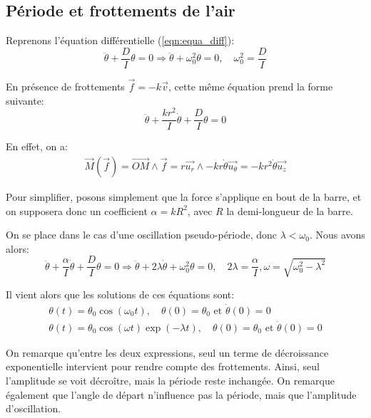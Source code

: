 \documentclass[12pt]{article}
\newcommand{\ut}{\vec{u_\theta}}
\newcommand{\ur}{\vec{u_r}}
\newcommand{\uz}{\vec{u_z}}
\begin{document}
\break
\subsection{Période et frottements de l'air}
\label{section:periode}
Reprenons l'équation différentielle (\ref{eqn:equa_diff}):
\begin{equation}
    \ddot \theta + \frac{D}{I}\theta = 0 \Rightarrow \ddot \theta + \omega_0^2 \theta = 0, \quad \omega_0^2 = \frac{D}{I}
    \label{eqn:sans_frottements}
\end{equation}


En présence de frottements $\vec{f} = -k \vec{v}$, cette même équation prend la forme suivante:
\begin{equation}
    \ddot \theta + \frac{k r^2}{I} \dot \theta + \frac{D}{I}\theta = 0
\end{equation}

En effet, on a:
\begin{align}
    \vec{M}(\vec{f}) = \vec{OM} \wedge \vec{f} = r\ur \wedge -k r \dot \theta \ut = -k r^2 \dot \theta \uz
\end{align}

Pour simplifier, posons simplement que la force s'applique en bout de la barre, et on supposera donc un coefficient 
$\alpha = k R^2$, avec $R$ la demi-longueur de la barre.

On se place dans le cas d'une oscillation pseudo-période, donc $\lambda < \omega_0$. Nous avons alors:
\begin{equation}
    \ddot \theta + \frac{\alpha}{I} \dot \theta + \frac{D}{I}\theta = 0 \Rightarrow \ddot \theta + 2\lambda \dot \theta + \omega_0^2\theta = 0, \quad 2\lambda = \frac{\alpha}{I}, \omega = \sqrt{\omega_0^2 - \lambda^2} 
    \label{eqn:avec_frottements}
\end{equation}

Il vient alors que les solutions de ces équations sont:
\begin{align}
    \theta(t) = \theta_0 \cos(\omega_0 t), \quad \theta(0) = \theta_0 \text{ et } \dot \theta(0) = 0 \\
    \theta(t) = \theta_0 \cos(\omega t) \exp(-\lambda t), \quad \theta(0) = \theta_0 \text{ et } \dot \theta(0) = 0
\end{align}

On remarque qu'entre les deux expressions, seul un terme de décroissance exponentielle intervient pour rendre compte des frottements.
Ainsi, seul l'amplitude se voit décroître, mais la période reste inchangée.
On remarque également que l'angle de départ n'influence pas la période, mais que l'amplitude d'oscillation.
\end{document}
